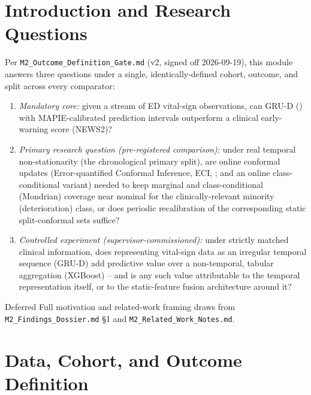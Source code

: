 \documentclass[11pt]{article}
\begin{document}
\section{Introduction and Research Questions}

Per \texttt{M2\_Outcome\_Definition\_Gate.md} (v2, signed off 2026-09-19), this module answers three questions under a single, identically-defined cohort, outcome, and split across every comparator:

\begin{enumerate}[leftmargin=*]
\item \emph{Mandatory core:} given a stream of ED vital-sign observations, can GRU-D (\cite{che2018recurrent}) with MAPIE-calibrated prediction intervals outperform a clinical early-warning score (NEWS2)?
\item \emph{Primary research question (pre-registered comparison):} under real temporal non-stationarity (the chronological primary split), are online conformal updates (Error-quantified Conformal Inference, ECI, \cite{wu2025error}; and an online class-conditional variant) needed to keep marginal and class-conditional (Mondrian) coverage near nominal for the clinically-relevant minority (deterioration) class, or does periodic recalibration of the corresponding static split-conformal sets suffice?
\item \emph{Controlled experiment (supervisor-commissioned):} under strictly matched clinical information, does representing vital-sign data as an irregular temporal sequence (GRU-D) add predictive value over a non-temporal, tabular aggregation (XGBoost) -- and is any such value attributable to the temporal representation itself, or to the static-feature fusion architecture around it?
\end{enumerate}

\begin{prosetodo}{Deferred}
Full motivation and related-work framing draws from \texttt{M2\_Findings\_Dossier.md} \S1 and \texttt{M2\_Related\_Work\_Notes.md}.
\end{prosetodo}

\section{Data, Cohort, and Outcome Definition}
\label{sec:data}
\end{document}
